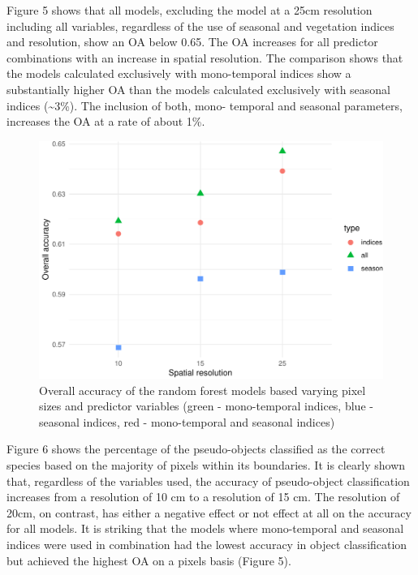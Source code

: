 \documentclass[]{article}
\begin{document}
Figure 5 shows that all models, excluding the model at a 25cm resolution
including all variables, regardless of the use of seasonal and
vegetation indices and resolution, show an OA below 0.65. The OA
increases for all predictor combinations with an increase in spatial
resolution. The comparison shows that the models calculated exclusively
with mono-temporal indices show a substantially higher OA than the
models calculated exclusively with seasonal indices
(\textasciitilde{}3\%). The inclusion of both, mono- temporal and
seasonal parameters, increases the OA at a rate of about 1\%.

\begin{figure}[H]

{\centering \includegraphics[width=0.6\linewidth]{report_files/figure-latex/result_plots-1} 

}

\caption{Overall accuracy of the random forest models based varying pixel sizes and predictor variables (green - mono-temporal indices, blue - seasonal indices, red - mono-temporal and seasonal indices)}\label{fig:result_plots}
\end{figure}

Figure 6 shows the percentage of the pseudo-objects classified as the
correct species based on the majority of pixels within its boundaries.
It is clearly shown that, regardless of the variables used, the accuracy
of pseudo-object classification increases from a resolution of 10 cm to
a resolution of 15 cm. The resolution of 20cm, on contrast, has either a
negative effect or not effect at all on the accuracy for all models. It
is striking that the models where mono-temporal and seasonal indices
were used in combination had the lowest accuracy in object
classification but achieved the highest OA on a pixels basis (Figure 5).
\end{document}
